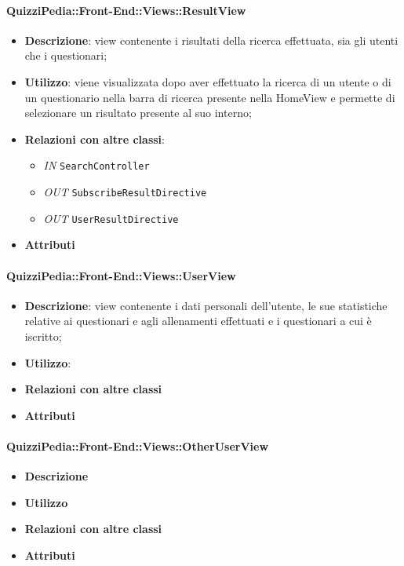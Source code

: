 \paragraph{QuizziPedia::Front-End::Views::ResultView}
\begin{itemize}
	\item \textbf{Descrizione}: view contenente i risultati della ricerca effettuata, sia gli utenti che i questionari;
	\item \textbf{Utilizzo}: viene visualizzata dopo aver effettuato la ricerca di un utente o di un questionario nella barra di ricerca presente nella HomeView e permette di selezionare un risultato presente al suo interno; 
	\item \textbf{Relazioni con altre classi}:
	\begin{itemize}
		\item \textit{IN} \texttt{SearchController} \\
		\item \textit{OUT} \texttt{SubscribeResultDirective} \\
		\item \textit{OUT} \texttt{UserResultDirective} \\ 
	\end{itemize}
	\item \textbf{Attributi}
\end{itemize}

\paragraph{QuizziPedia::Front-End::Views::UserView}
\begin{itemize}
	\item \textbf{Descrizione}: view contenente i dati personali dell'utente, le sue statistiche relative ai questionari e agli allenamenti effettuati e i questionari a cui è iscritto;
	\item \textbf{Utilizzo}:  
	\item \textbf{Relazioni con altre classi}
	\item \textbf{Attributi}
\end{itemize}

\paragraph{QuizziPedia::Front-End::Views::OtherUserView}
\begin{itemize}
	\item \textbf{Descrizione}
	\item \textbf{Utilizzo}
	\item \textbf{Relazioni con altre classi}
	\item \textbf{Attributi}
	\end{itemize}
